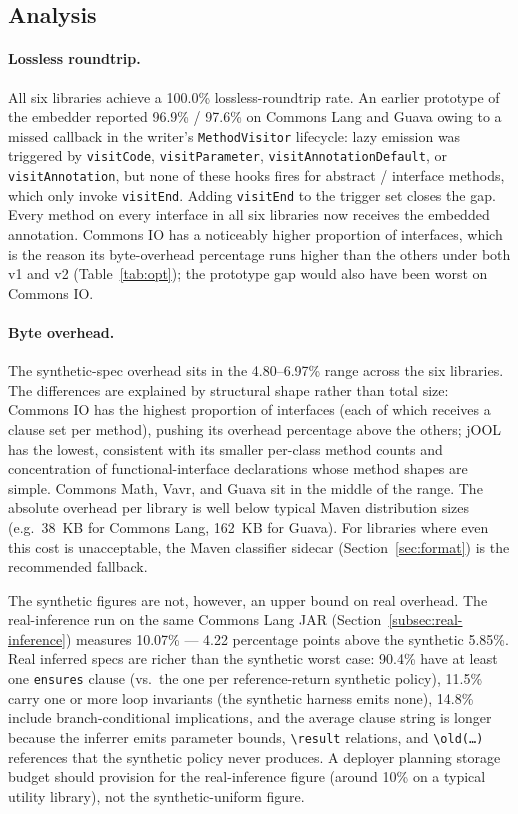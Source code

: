 \subsection{Analysis}

\paragraph{Lossless roundtrip.}
All six libraries achieve a 100.0\% lossless-roundtrip rate. An earlier prototype of the embedder reported 96.9\% / 97.6\% on Commons Lang and Guava owing to a missed callback in the writer's \texttt{MethodVisitor} lifecycle: lazy emission was triggered by \texttt{visitCode}, \texttt{visitParameter}, \texttt{visitAnnotationDefault}, or \texttt{visitAnnotation}, but none of these hooks fires for abstract / interface methods, which only invoke \texttt{visitEnd}. Adding \texttt{visitEnd} to the trigger set closes the gap. Every method on every interface in all six libraries now receives the embedded annotation. Commons IO has a noticeably higher proportion of interfaces, which is the reason its byte-overhead percentage runs higher than the others under both v1 and v2 (Table~\ref{tab:opt}); the prototype gap would also have been worst on Commons IO.

\paragraph{Byte overhead.}
The synthetic-spec overhead sits in the 4.80--6.97\% range across the six libraries. The differences are explained by structural shape rather than total size: Commons IO has the highest proportion of interfaces (each of which receives a clause set per method), pushing its overhead percentage above the others; jOOL has the lowest, consistent with its smaller per-class method counts and concentration of functional-interface declarations whose method shapes are simple. Commons Math, Vavr, and Guava sit in the middle of the range. The absolute overhead per library is well below typical Maven distribution sizes (e.g.\ 38~KB for Commons Lang, 162~KB for Guava). For libraries where even this cost is unacceptable, the Maven classifier sidecar (Section~\ref{sec:format}) is the recommended fallback.

The synthetic figures are not, however, an upper bound on real overhead. The real-inference run on the same Commons Lang JAR (Section~\ref{subsec:real-inference}) measures 10.07\% --- 4.22 percentage points above the synthetic 5.85\%. Real inferred specs are richer than the synthetic worst case: 90.4\% have at least one \texttt{ensures} clause (vs.\ the one per reference-return synthetic policy), 11.5\% carry one or more loop invariants (the synthetic harness emits none), 14.8\% include branch-conditional implications, and the average clause string is longer because the inferrer emits parameter bounds, \texttt{\textbackslash result} relations, and \texttt{\textbackslash old(\dots)} references that the synthetic policy never produces. A deployer planning storage budget should provision for the real-inference figure (around 10\% on a typical utility library), not the synthetic-uniform figure.

